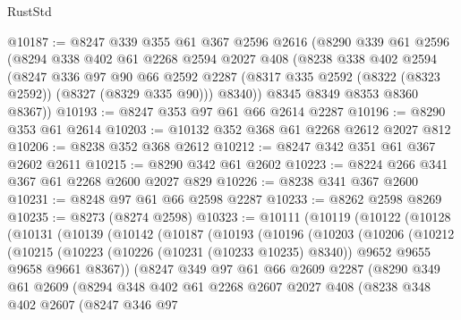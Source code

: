 \begin{lexlean}{RustStd}
\begin{coremodule}
@10187 := @8247
    @339
    @355
    @61
    @367
    @2596
    @2616
    (@8290
      @339
      @61
      @2596
      (@8294
        @338
        @402
        @61
        @2268
        @2594
        @2027
        @408
        (@8238
          @338
          @402
          @2594
          (@8247
            @336
            @97
            @90
            @66
            @2592
            @2287
            (@8317 @335 @2592 (@8322 (@8323 @2592)) (@8327 (@8329 @335 @90)))
            @8340))
        @8345
        @8349
        @8353
        @8360
        @8367))
@10193 := @8247 @353 @97 @61 @66 @2614 @2287
@10196 := @8290 @353 @61 @2614
@10203 := @10132 @352 @368 @61 @2268 @2612 @2027 @812
@10206 := @8238 @352 @368 @2612
@10212 := @8247 @342 @351 @61 @367 @2602 @2611
@10215 := @8290 @342 @61 @2602
@10223 := @8224 @266 @341 @367 @61 @2268 @2600 @2027 @829
@10226 := @8238 @341 @367 @2600
@10231 := @8248 @97 @61 @66 @2598 @2287
@10233 := @8262 @2598 @8269
@10235 := @8273 (@8274 @2598)
@10323 := @10111
    (@10119
      (@10122
        (@10128
          (@10131
            (@10139
              (@10142
                (@10187
                  (@10193
                    (@10196
                      (@10203
                        (@10206
                          (@10212
                            (@10215
                              (@10223
                                (@10226 (@10231 (@10233 @10235) @8340))
                                @9652
                                @9655
                                @9658
                                @9661
                                @8367))
                            (@8247
                              @349
                              @97
                              @61
                              @66
                              @2609
                              @2287
                              (@8290
                                @349
                                @61
                                @2609
                                (@8294
                                  @348
                                  @402
                                  @61
                                  @2268
                                  @2607
                                  @2027
                                  @408
                                  (@8238
                                    @348
                                    @402
                                    @2607
                                    (@8247
                                      @346
                                      @97

\end{coremodule}
\end{lexlean}

